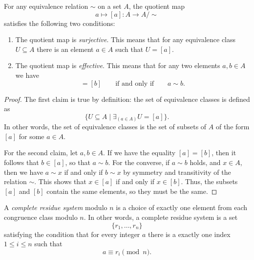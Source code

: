 \begin{proposition}\label{proposition:quotient-map}
  For any equivalence relation $\sim$ on a set $A$, the quotient map
  \begin{equation*}
    a\mapsto [a] : A \to A/{\sim}
  \end{equation*}
  satisfies the following two conditions:
  \begin{enumerate}
  \item The quotient map is \emph{surjective}. This means that for any equivalence class $U\subseteq A$ there is an element $a\in A$ such that $U=[a]$.
  \item The quotient map is \emph{effective}. This means that for any two elements $a,b\in A$ we have
    \begin{equation*}
      [a]=[b]\qquad\text{if and only if}\qquad a\sim b.
    \end{equation*}
  \end{enumerate}
\end{proposition}

\begin{proof}
  The first claim is true by definition: the set of equivalence classes is defined as
  \begin{equation*}
    \{U\subseteq A\mid \exists_{(a\in A)}U=[a]\}.
  \end{equation*}
  In other words, the set of equivalence classes is the set of subsets of $A$ of the form $[a]$ for some $a\in A$.

  For the second claim, let $a,b\in A$. If we have the equality $[a]=[b]$, then it follows that $b\in [a]$, so that $a\sim b$. For the converse, if $a\sim b$ holds, and $x\in A$, then we have $a\sim x$ if and only if $b\sim x$ by symmetry and transitivity of the relation $\sim$. This shows that $x\in [a]$ if and only if $x\in [b]$. Thus, the subsets $[a]$ and $[b]$ contain the same elements, so they must be the same.
\end{proof}

\begin{definition}
  A \emph{complete residue system} modulo $n$ is a choice of exactly one element from each congruence class modulo $n$. In other words, a complete residue system is a set
\begin{equation*}
  \{r_1,\ldots,r_n\}
\end{equation*}
satisfying the condition that for every integer $a$ there is a exactly one index $1\leq i\leq n$ such that
\begin{equation*}
  a\equiv r_i \pmod{n}.
\end{equation*}
\end{definition}

